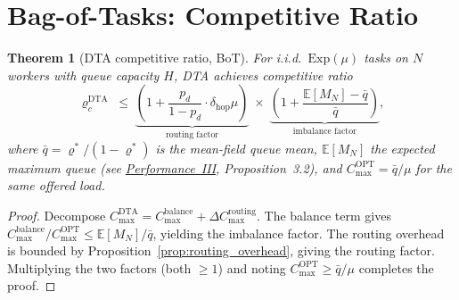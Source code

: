 \documentclass[11pt,a4paper]{report}
\newtheorem{theorem}{Theorem}[section]
\begin{document}
\section{Bag-of-Tasks: Competitive Ratio}

\begin{theorem}[DTA competitive ratio, BoT]\label{thm:cr_bot}
For i.i.d.\ $\mathrm{Exp}(\mu)$ tasks on $N$ workers with queue capacity $H$,
DTA achieves competitive ratio
\begin{equation}\label{eq:cr_main}
  \varrho_c^{\mathrm{DTA}}
  \;\le\;
  \underbrace{\left(1 + \frac{p_d}{1-p_d}\cdot \delta_{\mathrm{hop}}\mu\right)}_{\text{routing factor}}
  \;\times\;
  \underbrace{\left(1 + \frac{\mathbb{E}[M_N] - \bar q}{\bar q}\right)}_{\text{imbalance factor}},
\end{equation}
where $\bar q = \varrho^*/(1-\varrho^*)$ is the mean-field queue mean,
$\mathbb{E}[M_N]$ the expected maximum queue (see
\hyperref[chap:makespan]{Performance~III}, Proposition~3.2), and
$C_{\max}^{\mathrm{OPT}} = \bar q / \mu$ for the same offered load.
\end{theorem}

\begin{proof}
Decompose $C_{\max}^{\mathrm{DTA}} = C_{\max}^{\mathrm{balance}} + \Delta C_{\max}^{\mathrm{routing}}$.
The balance term gives
$C_{\max}^{\mathrm{balance}} / C_{\max}^{\mathrm{OPT}} \le \mathbb{E}[M_N]/\bar q$,
yielding the imbalance factor.
The routing overhead is bounded by Proposition~\ref{prop:routing_overhead},
giving the routing factor.  Multiplying the two factors
(both $\ge 1$) and noting $C_{\max}^{\mathrm{OPT}} \ge \bar q/\mu$
completes the proof.
\end{proof}
\end{document}
